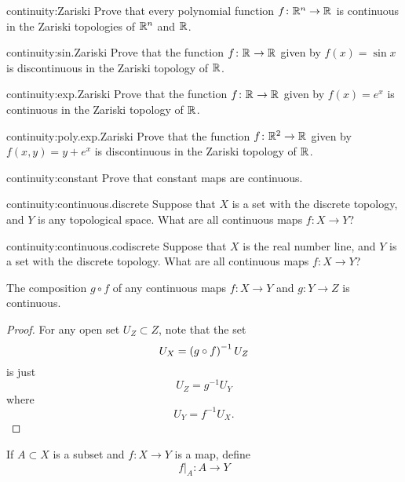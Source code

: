 \begin{problem}{continuity:Zariski}
Prove that every polynomial function \(f \colon \mathbb{R}^{n} \to \mathbb{R}^{}\) is continuous in the Zariski topologies of \(\mathbb{R}^{n}\) and \(\mathbb{R}^{}\).
\end{problem}
\begin{problem}{continuity:sin.Zariski}
Prove that the function \(f \colon \mathbb{R}^{} \to \mathbb{R}^{}\) given by \(f(x)=\sin x\) is discontinuous in the Zariski topology of \(\mathbb{R}^{}\).
\end{problem}
\begin{problem}{continuity:exp.Zariski}
Prove that the function \(f \colon \mathbb{R}^{} \to \mathbb{R}^{}\) given by \(f(x)=e^x\) is continuous in the Zariski topology of \(\mathbb{R}^{}\).
\end{problem}
\begin{problem}{continuity:poly.exp.Zariski}
Prove that the function \(f \colon \mathbb{R}^{2} \to \mathbb{R}^{}\) given by \(f(x,y)=y+e^x\) is discontinuous in the Zariski topology of \(\mathbb{R}^{}\).
\end{problem}
\begin{problem}{continuity:constant}
Prove that constant maps are continuous.
\end{problem}
\begin{problem}{continuity:continuous.discrete}
Suppose that \(X\) is a set with the discrete topology, and \(Y\) is any topological space.
What are all continuous maps \(f \colon X \to Y\)?
\end{problem}
\begin{problem}{continuity:continuous.codiscrete}
Suppose that \(X\) is the real number line, and \(Y\) is a set with the discrete topology.
What are all continuous maps \(f \colon X \to Y\)?
\end{problem}
\begin{lemma}
The composition \(g \circ f\) of any continuous maps \(f \colon X \to Y\) and \(g \colon Y \to Z\) is continuous.
\end{lemma}
\begin{proof}
For any open set \(U_Z \subset Z\), note that the set
\[
U_X = \left(g \circ f\right)^{-1} U_Z
\]
is just 
\[
U_Z = g^{-1} U_Y
\]
where
\[
U_Y = f^{-1} U_X.
\]
\end{proof}
If \(A \subset X\) is a subset and \(f \colon X \to Y\) is a map, define
\[
\left.f\right|_A \colon A \to Y
\]
